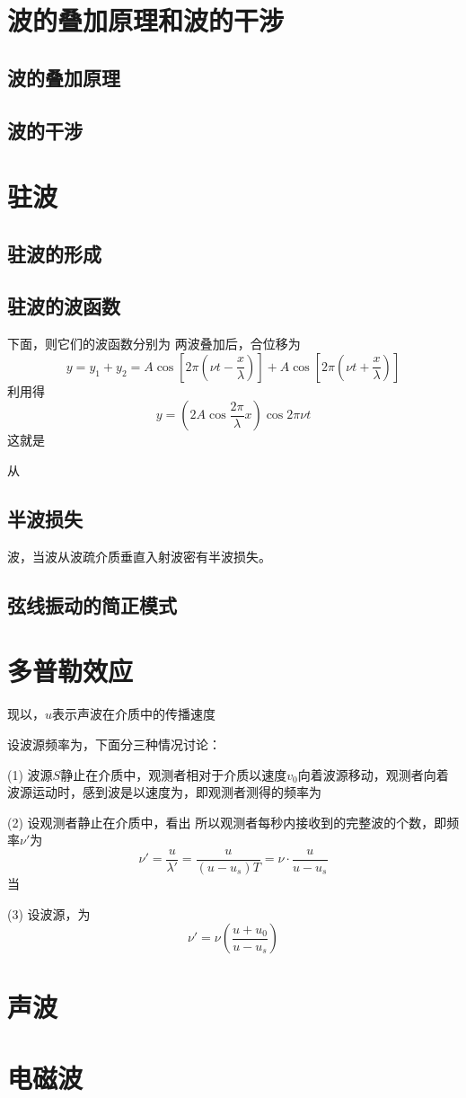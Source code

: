 \section{波的叠加原理和波的干涉}
    \subsection{波的叠加原理}
    \subsection{波的干涉}

\section{驻波}
    \subsection{驻波的形成}
    \subsection{驻波的波函数}
    下面，则它们的波函数分别为
    两波叠加后，合位移为
    \[
    y=y_1+y_2=A\cos\left[2\pi\left(\nu t-\frac{x}{\lambda}\right)\right]+A\cos\left[2\pi\left(\nu t+\frac{x}{\lambda}\right)\right]
    \]
    利用得
    \[
    y=\left(2A\cos{\frac{2\pi}{\lambda}x}\right)\cos{2\pi \nu t}
    \]
    这就是

    从

    \subsection{半波损失}
    波，当波从波疏介质垂直入射波密有半波损失。
    \subsection{弦线振动的简正模式}

\section{多普勒效应}
    现以，$u$表示声波在介质中的传播速度

    设波源频率为，下面分三种情况讨论：

    (1) 波源$S$静止在介质中，观测者相对于介质以速度$v_0$向着波源移动，观测者向着波源运动时，感到波是以速度为，即观测者测得的频率为

    (2) 设观测者静止在介质中，看出
    所以观测者每秒内接收到的完整波的个数，即频率$\nu'$为
    \[
    \nu'=\frac{u}{\lambda'}=\frac{u}{(u-u_s)T}=\nu\cdot\frac{u}{u-u_s}
    \]
    当

    (3) 设波源，为
    \[
    \nu'=\nu\left(\frac{u+u_0}{u-u_s}\right)
    \]

\section{声波}

\section{电磁波}

\endinput
